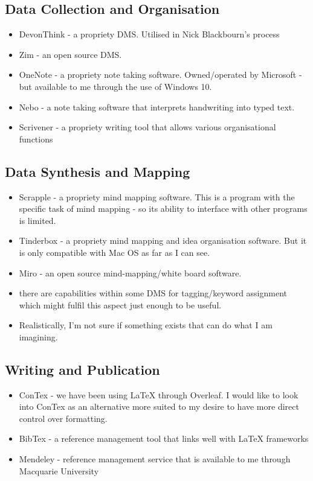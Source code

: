 \documentclass{article}
\begin{document}
\subsection{Data Collection and Organisation}

\begin{itemize}
    \item DevonThink - a propriety DMS. Utilised in Nick Blackbourn's process
    \item Zim - an open source DMS.
    \item OneNote - a propriety note taking software. Owned/operated by Microsoft - but available to me through the use of Windows 10. 
    \item Nebo - a note taking software that interprets handwriting into typed text.
    \item Scrivener - a propriety writing tool that allows various organisational functions
\end{itemize}


\subsection{Data Synthesis and Mapping}

\begin{itemize}
    \item Scrapple - a propriety mind mapping software. This is a program with the specific task of mind mapping - so its ability to interface with other programs is limited.
    \item Tinderbox - a propriety mind mapping and idea organisation software. But it is only compatible with Mac OS as far as I can see.
    \item Miro - an open source mind-mapping/white board software.
    \item there are capabilities within some DMS for tagging/keyword assignment which might fulfil this aspect just enough to be useful.
    \item  Realistically, I'm not sure if something exists that can do what I am imagining. 
\end{itemize}


\subsection{Writing and Publication}

\begin{itemize}
    \item ConTex - we have been using LaTeX through Overleaf. I would like to look into ConTex as an alternative more suited to my desire to have more direct control over formatting.
    \item BibTex - a reference management tool that links well with LaTeX frameworks
    \item Mendeley - reference management service that is available to me through Macquarie University
\end{itemize}
\end{document}
